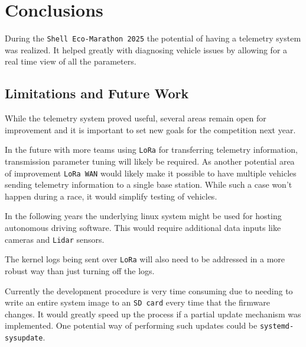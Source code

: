 \clearpage
\section{Conclusions}

During the \verb|Shell Eco-Marathon 2025| the potential of having a telemetry system was
realized. It helped greatly with diagnosing vehicle issues by allowing for a real time view
of all the parameters.

\subsection{Limitations and Future Work}
While the telemetry system proved useful, several areas remain open for improvement
and it is important to set new goals for the competition next year.

In the future with more teams using \verb|LoRa| for transferring telemetry information,
transmission parameter tuning will likely be required. As another potential area of improvement \verb|LoRa WAN| would likely make it possible to
have multiple vehicles sending telemetry information to a single base station.
While such a case won't happen during a race, it would simplify testing of vehicles.

In the following years the underlying linux system might be used for hosting autonomous driving software.
This would require additional data inputs like cameras and \verb|Lidar| sensors.

The kernel logs being sent over \verb|LoRa| will also need to be addressed in a more robust way than just turning off the logs.

Currently the development procedure is very time consuming due to needing to write an entire system image to an \verb|SD card|
every time that the firmware changes. It would greatly speed up the process if a partial update mechanism was implemented.
One potential way of performing such updates could be \verb|systemd-sysupdate|.